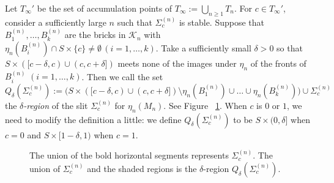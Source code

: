 \documentclass{amsart}
\theoremstyle{definition}
\numberwithin{figure}{section}
\numberwithin{equation}{section}
\def\ck{\mathcal{K}}
\def\eset{\emptyset}
\def\Sg{\Sigma}
\def\Sg{\Sigma}
\begin{document}
Let $T_\infty'$ be the set of accumulation points of $T_\infty :=\bigcup_{n\geq 1}T_n$.
For $c \in T_{\infty}'$, consider a sufficiently large $n$ such that  $\Sg_c^{(n)}$ is stable.
Suppose that $B_1^{(n)},\dots,B_k^{(n)}$ are the bricks in $\ck_n$ with $\eta_n(B_i^{(n)})\cap S \times \{c\} \neq \eset\, (i=1, \dots , k)$.
Take a sufficiently small $\delta>0$ so that $S \times ([c-\delta,c) \cup(c,c+\delta])$ meets none of the images  under $\eta_n$ of the fronts 
of $B_i^{(n)}$ $(i=1,\dots,k)$.   
Then we call the set 
$$Q_\delta(\Sg_c^{(n)}):=\bigl(S \times ([c-\delta,c)\cup (c,c+\delta])\setminus \eta_n(B_1^{(n)})\cup\dots\cup \eta_n(B_k^{(n)})\bigr)\cup \Sg_c^{(n)}$$
 the \emph{$\delta$-region} of the slit $\Sg_c^{(n)}$ for $\eta_n(M_n)$.
 See Figure \ \ref{fig2_2}.
 When $c$ is $0$ or $1$, we need to modify the definition a little: we define $Q_\delta(\Sg_c^{(n)})$ to be $S \times (0,\delta]$ when $c=0$ and  $S \times [1-\delta, 1)$ when $c=1$.
\begin{figure}[hbtp]
\centering
{}
\caption{The union of the bold horizontal segments represents $\Sg_c^{(n)}$.
The union of $\Sg_c^{(n)}$ and the shaded regions is the $\delta$-region $Q_\delta(\Sg_c^{(n)})$.}
\label{fig2_2}
\end{figure}



\end{document}

